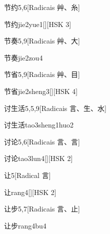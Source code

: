 \begin{entry}{节约}{5,6}[Radicais ⾋、⽷]
  \begin{phonetics}{节约}{jie2yue1}[][HSK 3]
  \end{phonetics}
\end{entry}

\begin{entry}{节奏}{5,9}[Radicais ⾋、⼤]
  \begin{phonetics}{节奏}{jie2zou4}
  \end{phonetics}
\end{entry}

\begin{entry}{节省}{5,9}[Radicais ⾋、⽬]
  \begin{phonetics}{节省}{jie2sheng3}[][HSK 4]
  \end{phonetics}
\end{entry}

\begin{entry}{讨生活}{5,5,9}[Radicais ⾔、⽣、⽔]
  \begin{phonetics}{讨生活}{tao3sheng1huo2}
  \end{phonetics}
\end{entry}

\begin{entry}{讨论}{5,6}[Radicais ⾔、⾔]
  \begin{phonetics}{讨论}{tao3lun4}[][HSK 2]
  \end{phonetics}
\end{entry}

\begin{entry}{让}{5}[Radical ⾔]
  \begin{phonetics}{让}{rang4}[][HSK 2]
  \end{phonetics}
\end{entry}

\begin{entry}{让步}{5,7}[Radicais ⾔、⽌]
  \begin{phonetics}{让步}{rang4bu4}
  \end{phonetics}
\end{entry}

